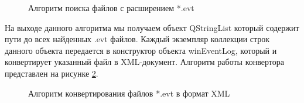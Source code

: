 \begin{figure}[h!]
\caption{Алгоритм поиска файлов с расширением *.evt}
\label{evtsearch:evtSearch}
\end{figure}

На выходе данного алгоритма мы получаем объект QStringList который содержит пути до всех найденных .evt файлов. Каждый экземпляр коллекции строк данного объекта передается в конструктор объекта winEventLog, который и конвертирует указанный файл в XML-документ. Алгоритм работы конвертора представлен на рисунке \ref{evtxml:evtToXML}.

\begin{figure}[h!]
\caption{Алгоритм конвертирования файлов *.evt в формат XML}
\label{evtxml:evtToXML}
\end{figure}
